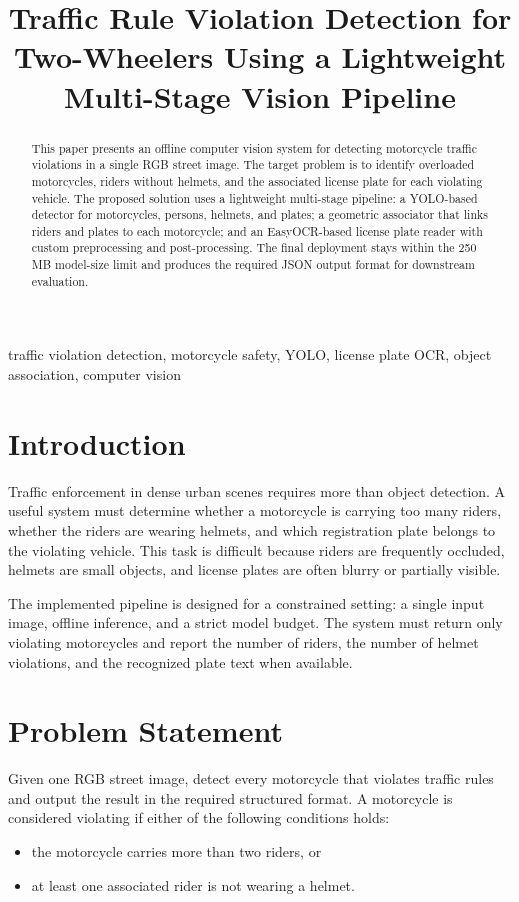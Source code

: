 \documentclass[conference]{IEEEtran}
\title{Traffic Rule Violation Detection for Two-Wheelers Using a Lightweight Multi-Stage Vision Pipeline}
\author{\IEEEauthorblockN{Vishal Reddy K}
\IEEEauthorblockA{Computer Vision Course Project}}
\begin{document}
\maketitle

\begin{abstract}
This paper presents an offline computer vision system for detecting motorcycle traffic violations in a single RGB street image. The target problem is to identify overloaded motorcycles, riders without helmets, and the associated license plate for each violating vehicle. The proposed solution uses a lightweight multi-stage pipeline: a YOLO-based detector for motorcycles, persons, helmets, and plates; a geometric associator that links riders and plates to each motorcycle; and an EasyOCR-based license plate reader with custom preprocessing and post-processing. The final deployment stays within the 250 MB model-size limit and produces the required JSON output format for downstream evaluation.
\end{abstract}

\begin{IEEEkeywords}
traffic violation detection, motorcycle safety, YOLO, license plate OCR, object association, computer vision
\end{IEEEkeywords}

\section{Introduction}
Traffic enforcement in dense urban scenes requires more than object detection. A useful system must determine whether a motorcycle is carrying too many riders, whether the riders are wearing helmets, and which registration plate belongs to the violating vehicle. This task is difficult because riders are frequently occluded, helmets are small objects, and license plates are often blurry or partially visible.

The implemented pipeline is designed for a constrained setting: a single input image, offline inference, and a strict model budget. The system must return only violating motorcycles and report the number of riders, the number of helmet violations, and the recognized plate text when available.

\section{Problem Statement}
Given one RGB street image, detect every motorcycle that violates traffic rules and output the result in the required structured format. A motorcycle is considered violating if either of the following conditions holds:
\begin{itemize}
        \item the motorcycle carries more than two riders, or
        \item at least one associated rider is not wearing a helmet.
\end{itemize}
\end{document}
